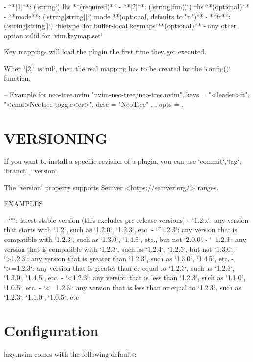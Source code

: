 \begin{listing}
- **[1]**: (`string`) lhs **(required)**
- **[2]**: (`string|fun()`) rhs **(optional)**
- **mode**: (`string|string[]`) mode **(optional, defaults to "n")**
- **ft**: (`string|string[]`) `filetype` for buffer-local keymaps **(optional)**
- any other option valid for `vim.keymap.set`

Key mappings will load the plugin the first time they get executed.

When `[2]` is `nil`, then the real mapping has to be created by the `config()`
function.


-- Example for neo-tree.nvim
{
"nvim-neo-tree/neo-tree.nvim",
keys = {
{ "<leader>ft", "<cmd>Neotree toggle<cr>", desc = "NeoTree" },
},
opts = {},
}



\section{VERSIONING}

If you want to install a specific revision of a plugin, you can use `commit`,`tag`, `branch`, `version`.

The `version` property supports Semver <https://semver.org/> ranges.

EXAMPLES 
\begin{ve}
- `*`: latest stable version (this excludes pre-release versions)
- `1.2.x`: any version that starts with `1.2`, such as `1.2.0`, `1.2.3`, etc.
- `^1.2.3`: any version that is compatible with `1.2.3`, such as `1.3.0`, `1.4.5`, etc., but not `2.0.0`.
- `~1.2.3`: any version that is compatible with `1.2.3`, such as `1.2.4`, `1.2.5`, but not `1.3.0`.
- `>1.2.3`: any version that is greater than `1.2.3`, such as `1.3.0`, `1.4.5`, etc.
- `>=1.2.3`: any version that is greater than or equal to `1.2.3`, such as `1.2.3`, `1.3.0`, `1.4.5`, etc.
- `<1.2.3`: any version that is less than `1.2.3`, such as `1.1.0`, `1.0.5`, etc.
- `<=1.2.3`: any version that is less than or equal to `1.2.3`, such as `1.2.3`, `1.1.0`, `1.0.5`, etc
\end{ve}


\section{Configuration}
lazy.nvim comes with the following defaults:


\end{listing}
